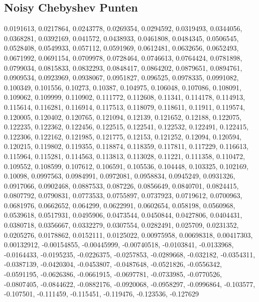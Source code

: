 \documentclass[10pt,a4paper,twocolumn]{article}
\begin{document}
\subsection{Noisy Chebyshev Punten}
0.0191613, 0.0217864, 0.0243778, 0.0269354, 0.0294592, 0.0319493, 0.0344056, 0.0368281, 0.0392169, 0.041572, 0.0438933, 0.0461808, 0.0484345, 0.0506545, 0.0528408, 0.0549933, 0.057112, 0.0591969, 0.0612481, 0.0632656, 0.0652493, 0.0671992, 0.0691154, 0.0709978, 0.0728464, 0.0746613, 0.0764424, 0.0781898, 0.0799034, 0.0815833, 0.0832293, 0.0848417, 0.0864202, 0.0879651, 0.0894761, 0.0909534, 0.0923969, 0.0938067, 0.0951827, 0.096525, 0.0978335, 0.0991082, 0.100349, 0.101556, 0.10273, 0.10387, 0.104975, 0.106048, 0.107086, 0.108091, 0.109062, 0.109999, 0.110902, 0.111772, 0.112608, 0.11341, 0.114178, 0.114913, 0.115614, 0.116281, 0.116914, 0.117513, 0.118079, 0.118611, 0.11911, 0.119574, 0.120005, 0.120402, 0.120765, 0.121094, 0.12139, 0.121652, 0.12188, 0.122075, 0.122235, 0.122362, 0.122456, 0.122515, 0.122541, 0.122532, 0.122491, 0.122415, 0.122306, 0.122162, 0.121985, 0.121775, 0.12153, 0.121252, 0.12094, 0.120594, 0.120215, 0.119802, 0.119355, 0.118874, 0.118359, 0.117811, 0.117229, 0.116613, 0.115964, 0.115281, 0.114563, 0.113813, 0.113028, 0.11221, 0.111358, 0.110472, 0.109552, 0.108599, 0.107612, 0.106591, 0.105536, 0.104448, 0.103325, 0.102169, 0.10098, 0.0997563, 0.0984991, 0.0972081, 0.0958834, 0.0945249, 0.0931326, 0.0917066, 0.0902468, 0.0887533, 0.087226, 0.0856649, 0.0840701, 0.0824415, 0.0807792, 0.0790831, 0.0773533, 0.0755897, 0.0737923, 0.0719612, 0.0700963, 0.0681976, 0.0662652, 0.064299, 0.0622991, 0.0602654, 0.058198, 0.0560968, 0.0539618, 0.0517931, 0.0495906, 0.0473544, 0.0450844, 0.0427806, 0.0404431, 0.0380718, 0.0356667, 0.0332279, 0.0307554, 0.0282491, 0.025709, 0.0231352, 0.0205276, 0.0178862, 0.0152111, 0.0125022, 0.00975958, 0.00698318, 0.00417303, 0.00132912, -0.00154855, -0.00445999, -0.00740518, -0.0103841, -0.0133968, -0.0164433, -0.0195235, -0.0226375, -0.0257853, -0.0289668, -0.032182, -0.0354311, -0.0387139, -0.0420304, -0.0453807, -0.0487648, -0.0521826, -0.0556342, -0.0591195, -0.0626386, -0.0661915, -0.0697781, -0.0733985, -0.0770526, -0.0807405, -0.0844622, -0.0882176, -0.0920068, -0.0958297, -0.0996864, -0.103577, -0.107501, -0.111459, -0.115451, -0.119476, -0.123536, -0.127629
\end{document}
